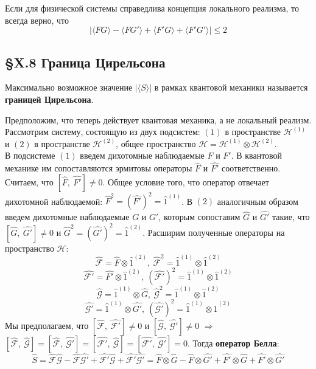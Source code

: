 \begin{theorem}
	Если для физической системы справедлива концепция локального реализма, то всегда верно, что
	\[
	|\langle FG \rangle - \langle FG' \rangle + \langle F'G \rangle + \langle F'G' \rangle| \leq 2
	\]
\end{theorem}


\subsection{\S X.8 Граница Цирельсона}
\begin{definition}
	Максимально возможное значение $|\langle S\rangle|$ в рамках квантовой механики называется \textbf{границей Цирельсона}.
\end{definition}

Предположим, что теперь действует квантовая механика, а не локальный реализм. Рассмотрим систему, состоящую из двух подсистем: $(1)$ в пространстве $\mathcal{H}^{(1)}$ и $(2)$ в пространстве $\mathcal{H}^{(2)}$, общее пространство $\mathcal{H} = \mathcal{H}^{(1)}\otimes \mathcal{H}^{(2)}$.\\

В подсистеме $(1)$ введем дихотомные наблюдаемые $F$ и $F'$. В квантовой механике им сопоставляются эрмитовы операторы $\hat{F}$ и $\hat{F'}$ соответственно. Считаем, что $[\hat{F},~\hat{F'}]\neq 0$. Общее условие того, что оператор отвечает дихотомной наблюдаемой: $\hat{F}^2 = (\hat{F'})^2 = \hat{1}^{(1)}$. В $(2)$ аналогичным образом введем дихотомные наблюдаемые $G$ и $G'$, которым сопоставим $\hat{G}$ и $\hat{G'}$ такие, что $[\hat{G},~\hat{G'}]\neq 0$ и $\hat{G}^2 = (\hat{G'})^2 = \hat{1}^{(2)}$. Расширим полученные операторы на пространство $\mathcal{H}$:
\[
\hat{\mathcal{F}} = \hat{F}\otimes\hat{1}^{(2)},\ \hat{\mathcal{F}}^2 = \hat{1}^{(1)}\otimes\hat{1}^{(2)}
\]
\[
\hat{\mathcal{F'}} = \hat{F'}\otimes\hat{1}^{(2)},\ (\hat{\mathcal{F'}})^2 = \hat{1}^{(1)}\otimes\hat{1}^{(2)}
\]
\[
\hat{\mathcal{G}} = \hat{1}^{(1)}\otimes\hat{G},\ \hat{\mathcal{G}}^2 = \hat{1}^{(1)}\otimes\hat{1}^{(2)}
\]
\[
\hat{\mathcal{G'}} = \hat{1}^{(1)}\otimes\hat{G'},\ (\hat{\mathcal{G'}})^2 = \hat{1}^{(1)}\otimes\hat{1}^{(2)}
\]
Мы предполагаем, что $[\hat{\mathcal{F}},~\hat{\mathcal{F'}}]\neq 0$ и $[\hat{\mathcal{G}},~\hat{\mathcal{G'}}]\neq 0$ $\Longrightarrow$ $[\hat{\mathcal{F}},~\hat{\mathcal{G}}] = [\hat{\mathcal{F}},~\hat{\mathcal{G'}}] = [\hat{\mathcal{F'}},~\hat{\mathcal{G}}] = [\hat{\mathcal{F'}},~\hat{\mathcal{G'}}] = 0$. Тогда \textbf{оператор Белла}:
\[
\hat{S} = \hat{\mathcal{F}}\hat{\mathcal{G}} - \hat{\mathcal{F}}\hat{\mathcal{G'}} + \hat{\mathcal{F'}}\hat{\mathcal{G}} + \hat{\mathcal{F'}}\hat{\mathcal{G'}} = \hat{F}\otimes\hat{G} - \hat{F}\otimes\hat{G'} + \hat{F'}\otimes\hat{G} + \hat{F'}\otimes\hat{G'}
\]

